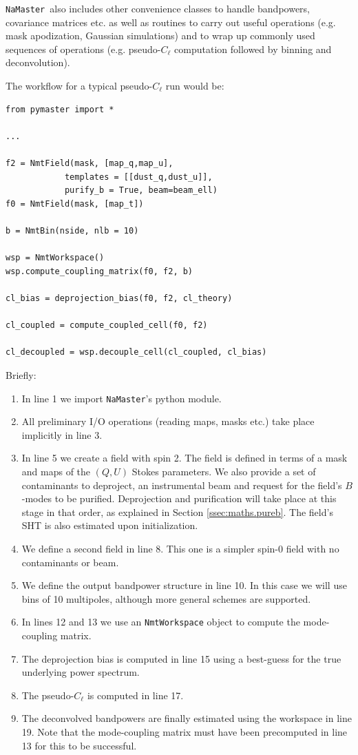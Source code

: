 \documentclass[usenatbib]{mnrasb}
\newcommand{\nmt}{{\tt NaMaster}}
\begin{document}
    \nmt~also includes other convenience classes to handle bandpowers, covariance matrices etc. as well as routines to carry out useful operations (e.g. mask apodization, Gaussian simulations) and to wrap up commonly used sequences of operations (e.g. pseudo-$C_\ell$ computation followed by binning and deconvolution).
    
    The workflow for a typical pseudo-$C_\ell$ run would be:
    \begin{lstlisting}
from pymaster import *

...

f2 = NmtField(mask, [map_q,map_u],
            templates = [[dust_q,dust_u]],
            purify_b = True, beam=beam_ell)
f0 = NmtField(mask, [map_t])

b = NmtBin(nside, nlb = 10)

wsp = NmtWorkspace()
wsp.compute_coupling_matrix(f0, f2, b)

cl_bias = deprojection_bias(f0, f2, cl_theory)

cl_coupled = compute_coupled_cell(f0, f2)

cl_decoupled = wsp.decouple_cell(cl_coupled, cl_bias)
    \end{lstlisting}
    Briefly:
    \begin{enumerate}
      \item In line 1 we import \nmt's python module.
      \item All preliminary I/O operations (reading maps, masks etc.) take place implicitly in line 3.
      \item In line 5 we create a field with spin 2. The field is defined in terms of a mask and maps of the $(Q,U)$ Stokes parameters. We also provide a set of contaminants to deproject, an instrumental beam and request for the field's $B$-modes to be purified. Deprojection and purification will take place at this stage in that order, as explained in Section \ref{ssec:maths.pureb}. The field's SHT is also estimated upon initialization.
      \item We define a second field in line 8. This one is a simpler spin-0 field with no contaminants or beam.
      \item We define the output bandpower structure in line 10. In this case we will use bins of 10 multipoles, although more general schemes are supported.
      \item In lines 12 and 13 we use an {\tt NmtWorkspace} object to compute the mode-coupling matrix.
      \item The deprojection bias is computed in line 15 using a best-guess for the true underlying power spectrum.
      \item The pseudo-$C_\ell$ is computed in line 17.
      \item The deconvolved bandpowers are finally estimated using the workspace in line 19. Note that the mode-coupling matrix must have been precomputed in line 13 for this to be successful.
    \end{enumerate}
    
\end{document}
